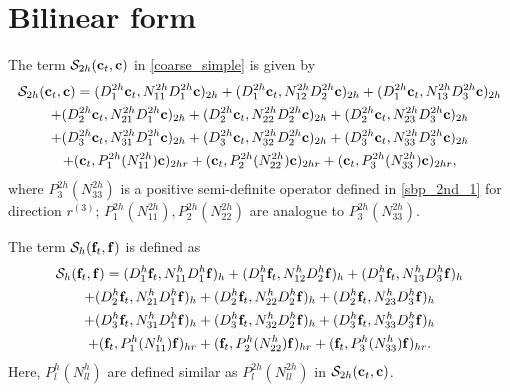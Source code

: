 \section{Bilinear form}\label{appendix_bf}
The term $\mathcal{S}_{2h}({\bf c}_t,{\bf c})$ in \eqref{coarse_simple} is given by
\begin{multline*}
\mathcal{S}_{2h}({\bf c}_t,{\bf c}) = ({D}_1^{2h}{\bf c}_t,{N}_{11}^{2h}{D}_1^{2h}{\bf c})_{2h} +  ({D}_1^{2h}{\bf c}_t,{N}_{12}^{2h}{D}_2^{2h}{\bf c})_{2h} +  ({D}_1^{2h}{\bf c}_t,{N}_{13}^{2h}{D}_3^{2h}{\bf c})_{2h}\\
+  ({D}_2^{2h}{\bf c}_t,{N}_{21}^{2h}{D}_1^{2h}{\bf c})_{2h} 
+  ({D}_2^{2h}{\bf c}_t,{N}_{22}^{2h}{D}_2^{2h}{\bf c})_{2h} +  ({D}_2^{2h}{\bf c}_t,{N}_{23}^{2h}{D}_3^{2h}{\bf c})_{2h} \\
+  ({D}_3^{2h}{\bf c}_t,{N}_{31}^{2h}{D}_1^{2h}{\bf c})_{2h} 
+  ({D}_3^{2h}{\bf c}_t,{N}_{32}^{2h}{D}_2^{2h}{\bf c})_{2h} +  ({D}_3^{2h}{\bf c}_t,{N}_{33}^{2h}{D}_3^{2h}{\bf c})_{2h}\\
+ ({\bf c}_t, P^{2h}_1(N_{11}^{2h}){\bf c})_{2hr} + ({\bf c}_t, P^{2h}_2(N_{22}^{2h}){\bf c})_{2hr} + ({\bf c}_t, P^{2h}_3(N_{33}^{2h}){\bf c})_{2hr},
\end{multline*}
where $P_3^{2h}(N_{33}^{2h})$ is a positive semi-definite operator defined in \eqref{sbp_2nd_1} for direction $r^{(3)}$; $P_1^{2h}(N_{11}^{2h}), P_2^{2h}(N_{22}^{2h})$ are analogue to $P_3^{2h}(N_{33}^{2h})$. 

The term $\mathcal{S}_{h}({\bf f}_t,{\bf f})$ is defined as
\begin{multline*}
\mathcal{S}_{h}({\bf f}_t,{\bf f}) = ({D}_1^{h}{\bf f}_t,{N}_{11}^{h}{D}_1^h{\bf f})_{h} +  ({D}_1^{h}{\bf f}_t,{N}_{12}^{h}{D}_2^h{\bf f})_{h} +  ({D}_1^{h}{\bf f}_t,{N}_{13}^{h}{D}_3^h{\bf f})_{h}\\
+  ({D}_2^{h}{\bf f}_t,{N}_{21}^{h}{D}_1^h{\bf f})_{h} 
+  ({D}_2^{h}{\bf f}_t,{N}_{22}^{h}{D}_2^h{\bf f})_{h} +  ({D}_2^{h}{\bf f}_t,{N}_{23}^{h}{D}_3^h{\bf f})_{h} \\
+  ({D}_3^{h}{\bf f}_t,{N}_{31}^{h}{D}_1^h{\bf f})_{h} 
+  ({D}_3^{h}{\bf f}_t,{N}_{32}^{h}{D}_2^h{\bf f})_{h} +  ({D}_3^{h}{\bf f}_t,{N}_{33}^{h}{D}_3^h{\bf f})_{h}\\
+ ({\bf f}_t, P^{h}_1(N_{11}^h){\bf f})_{hr} + ({\bf f}_t, P^{h}_2(N_{22}^h){\bf f})_{hr} + ({\bf f}_t, P^{h}_3(N_{33}^h){\bf f})_{hr}.
\end{multline*}
Here, $P_l^h(N_{ll}^h)$ are defined similar as $P_l^{2h}(N_{ll}^{2h})$ in $\mathcal{S}_{2h}({\bf c}_t,{\bf c})$. 